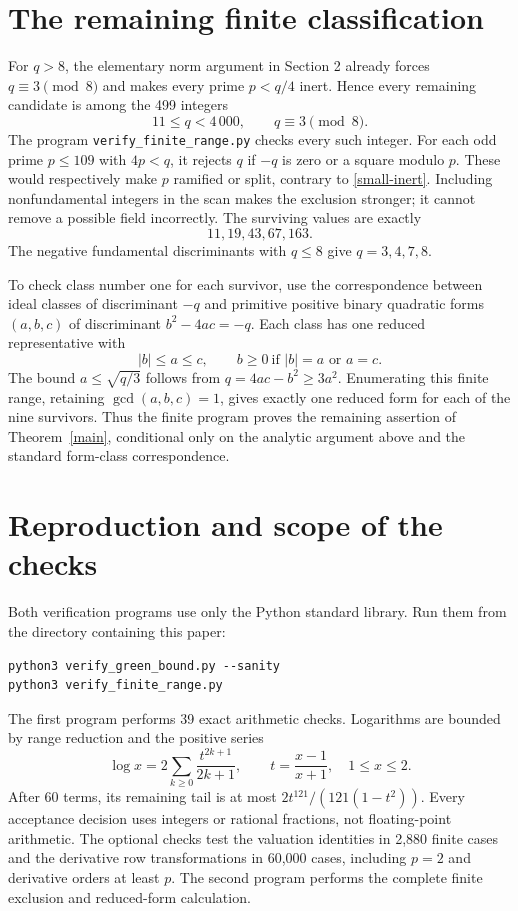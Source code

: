 \documentclass[11pt]{article}
\begin{document}
\section{The remaining finite classification}\label{finite}

For \(q>8\), the elementary norm argument in
Section 2 already forces \(q\equiv3\pmod8\) and makes every prime
\(p<q/4\) inert. Hence every remaining candidate is among the 499
integers
\[
 11\le q<4\,000,\qquad q\equiv3\pmod8.
\]
The program \texttt{verify\_finite\_range.py} checks every such integer.
For each odd prime \(p\le109\) with \(4p<q\), it rejects \(q\) if
\(-q\) is zero or a square modulo \(p\). These would respectively
make \(p\) ramified or split, contrary to \eqref{small-inert}.
Including nonfundamental integers in the scan makes the exclusion
stronger; it cannot remove a possible field incorrectly.
The surviving values are exactly
\[
 11,19,43,67,163.
\]
The negative fundamental discriminants with \(q\le8\) give
\(q=3,4,7,8\).

To check class number one for each survivor, use the correspondence
between ideal classes of discriminant \(-q\) and primitive positive
binary quadratic forms \((a,b,c)\) of discriminant
\(b^2-4ac=-q\). Each class has one reduced representative with
\[
 |b|\le a\le c,\qquad
 b\ge0\ \text{if }|b|=a\text{ or }a=c.
\]
The bound \(a\le\sqrt{q/3}\) follows from
\(q=4ac-b^2\ge3a^2\). Enumerating this finite range, retaining
\(\gcd(a,b,c)=1\), gives exactly one reduced form for each of the
nine survivors. Thus the finite program proves the remaining assertion
of Theorem~\ref{main}, conditional only on the analytic argument above
and the standard form-class correspondence.

\section{Reproduction and scope of the checks}

Both verification programs use only the Python standard library.
Run them from the directory containing this paper:
\begin{verbatim}
python3 verify_green_bound.py --sanity
python3 verify_finite_range.py
\end{verbatim}
The first program performs 39 exact arithmetic checks. Logarithms are
bounded by range reduction and the positive series
\[
 \log x=2\sum_{k\ge0}\frac{t^{2k+1}}{2k+1},\qquad
 t=\frac{x-1}{x+1},\quad1\le x\le2.
\]
After 60 terms, its remaining tail is at most
\(2t^{121}/(121(1-t^2))\). Every acceptance decision uses integers
or rational fractions, not floating-point arithmetic.
The optional checks test the valuation identities in 2,880 finite
cases and the derivative row transformations in 60,000 cases,
including \(p=2\) and derivative orders at least \(p\).
The second program performs the complete finite exclusion and
reduced-form calculation.
\end{document}
